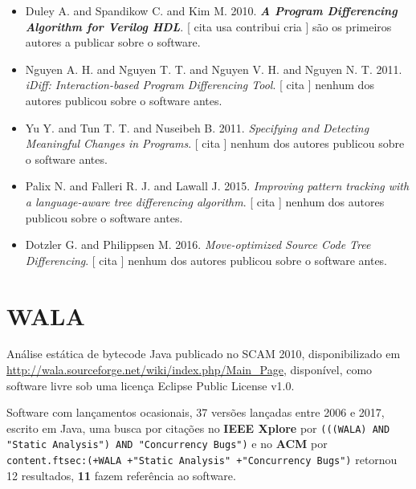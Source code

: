 \begin{itemize}
\item Duley A. and Spandikow C. and Kim M.
      2010.
        \textbf{\textit{ A Program Differencing Algorithm for Verilog HDL}}.
      [
          cita
          usa
          contribui
          cria
      ]
são os primeiros autores a publicar sobre o software.
\item Nguyen A. H. and Nguyen T. T. and Nguyen V. H. and Nguyen N. T.
      2011.
        \textit{ iDiff: Interaction-based Program Differencing Tool}.
      [
          cita
      ]
nenhum dos autores publicou sobre o software antes.
\item Yu Y. and Tun T. T. and Nuseibeh B.
      2011.
        \textit{ Specifying and Detecting Meaningful Changes in Programs}.
      [
          cita
      ]
nenhum dos autores publicou sobre o software antes.
\item Palix N. and Falleri R. J. and Lawall J.
      2015.
        \textit{ Improving pattern tracking with a language-aware tree differencing algorithm}.
      [
          cita
      ]
nenhum dos autores publicou sobre o software antes.
\item Dotzler G. and Philippsen M.
      2016.
        \textit{ Move-optimized Source Code Tree Differencing}.
      [
          cita
      ]
nenhum dos autores publicou sobre o software antes.
\end{itemize}
\section{WALA}

Análise estática de bytecode Java
publicado no SCAM 2010,
disponibilizado em \url{http://wala.sourceforge.net/wiki/index.php/Main_Page},
disponível,
como software livre
sob uma licença Eclipse Public License v1.0.

Software com lançamentos ocasionais,
37 versões lançadas
entre 2006 e 2017,
escrito em Java,
uma busca por citações no {\bf IEEE Xplore} por
\texttt{(((WALA) AND "Static Analysis") AND "Concurrency Bugs")}
e no {\bf ACM} por
\texttt{content.ftsec:(+WALA +"Static Analysis" +"Concurrency Bugs")}
retornou
12 resultados,
{\bf 11} fazem referência ao software.

